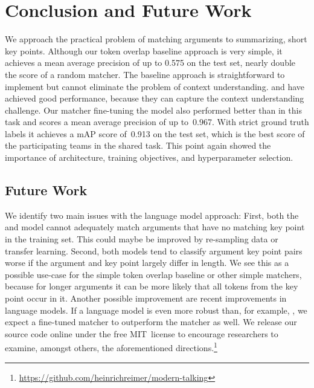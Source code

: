 \section{Conclusion and Future Work}\label{conclusion}

We approach the practical problem of matching arguments to summarizing, short key points.
Although our token overlap baseline approach is very simple, it achieves a mean average precision of up to 0.575 on the test set, nearly double the score of a random matcher. 
The baseline approach is straightforward to implement but cannot eliminate the problem of context understanding. 
\Roberta and \Bert have achieved good performance, because they can capture the context understanding challenge. 
Our matcher fine-tuning the \RobertaBase model also performed better than \Bert in this task and scores a mean average precision of up to~0.967. %
With strict ground truth labels it achieves a mAP score of~0.913 on the test set, which is the best score of the participating teams in the shared task.
This point again showed the importance of architecture, training objectives, and hyperparameter selection.

\subsection{Future Work}

We identify two main issues with the language model approach:
First, both the \BertBase and \RobertaBase model cannot adequately match arguments that have no matching key point in the training set.
This could maybe be improved by re-sampling data or transfer learning.
Second, both models tend to classify argument key point pairs worse if the argument and key point largely differ in length.
We see this as a possible use-case for the simple token overlap baseline or other simple matchers, because for longer arguments it can be more likely that all tokens from the key point occur in it.
Another possible improvement are recent improvements in language models. %
If a language model is even more robust than, for example, \Roberta, we expect a fine-tuned matcher to outperform the \RobertaBase matcher as well.
We release our source code online under the free MIT~license to encourage researchers to examine, amongst others, the aforementioned directions.\footnote{\url{https://github.com/heinrichreimer/modern-talking}}